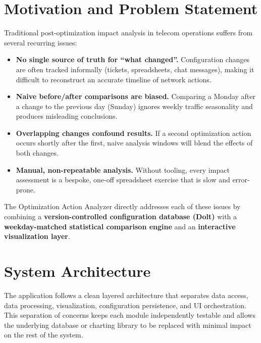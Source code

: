 \section{Motivation and Problem Statement}
Traditional post-optimization impact analysis in telecom operations
suffers from several recurring issues:

\begin{itemize}
    \item \textbf{No single source of truth for ``what changed''.}
        Configuration changes are often tracked informally (tickets,
        spreadsheets, chat messages), making it difficult to reconstruct
        an accurate timeline of network actions.
    \item \textbf{Naive before/after comparisons are biased.}
        Comparing a Monday after a change to the previous day (Sunday)
        ignores weekly traffic seasonality and produces misleading
        conclusions.
    \item \textbf{Overlapping changes confound results.}
        If a second optimization action occurs shortly after the first,
        naive analysis windows will blend the effects of both changes.
    \item \textbf{Manual, non-repeatable analysis.}
        Without tooling, every impact assessment is a bespoke, one-off
        spreadsheet exercise that is slow and error-prone.
\end{itemize}

The Optimization Action Analyzer directly addresses each of these issues
by combining a \textbf{version-controlled configuration database (Dolt)}
with a \textbf{weekday-matched statistical comparison engine} and an
\textbf{interactive visualization layer}.

\section{System Architecture}
The application follows a clean layered architecture that separates data
access, data processing, visualization, configuration persistence, and UI
orchestration. This separation of concerns keeps each module independently
testable and allows the underlying database or charting library to be
replaced with minimal impact on the rest of the system.

